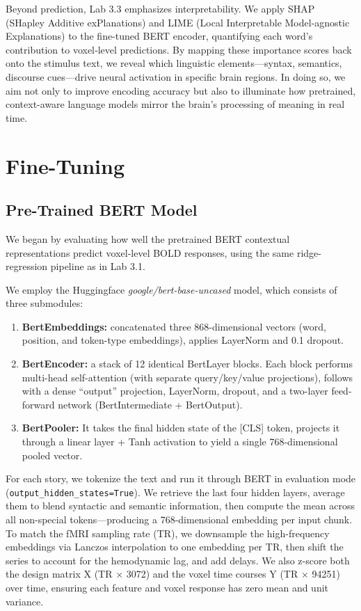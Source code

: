 \documentclass{article}
\begin{document}
Beyond prediction, Lab 3.3 emphasizes interpretability. We apply SHAP (SHapley Additive exPlanations) and LIME (Local Interpretable Model-agnostic Explanations) to the fine-tuned BERT encoder, quantifying each word’s contribution to voxel‐level predictions. By mapping these importance scores back onto the stimulus text, we reveal which linguistic elements—syntax, semantics, discourse cues—drive neural activation in specific brain regions. In doing so, we aim not only to improve encoding accuracy but also to illuminate how pretrained, context-aware language models mirror the brain’s processing of meaning in real time.


\section{Fine-Tuning}

\subsection{Pre-Trained BERT Model}

We began by evaluating how well the pretrained BERT contextual representations predict voxel-level BOLD responses, using the same ridge-regression pipeline as in Lab 3.1.

We employ the Huggingface \textit{google/bert-base-uncased} model, which consists of three submodules:

\begin{enumerate}
    \item \textbf{BertEmbeddings:} concatenated three 868-dimensional vectors (word, position, and token-type embeddings), applies LayerNorm and 0.1 dropout.
    \item \textbf{BertEncoder:} a stack of 12 identical BertLayer blocks. Each block performs multi-head self-attention (with separate query/key/value projections), follows with a dense “output” projection, LayerNorm, dropout, and a two-layer feed-forward network (BertIntermediate + BertOutput).
    \item \textbf{BertPooler:} It takes the final hidden state of the [CLS] token, projects it through a linear layer + Tanh activation to yield a single 768-dimensional pooled vector.
\end{enumerate}

For each story, we tokenize the text and run it through BERT in evaluation mode (\texttt{output\_hidden\_states=True}). We retrieve the last four hidden layers, average them to blend syntactic and semantic information, then compute the mean across all non-special tokens—producing a 768-dimensional embedding per input chunk. To match the fMRI sampling rate (TR), we downsample the high-frequency embeddings via Lanczos interpolation to one embedding per TR, then shift the series to account for the hemodynamic lag, and add delays. We also z-score both the design matrix X (TR × 3072) and the voxel time courses Y (TR × 94251) over time, ensuring each feature and voxel response has zero mean and unit variance.
\end{document}
